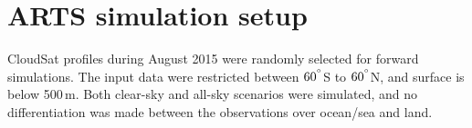 \documentclass[amt, manuscript]{copernicus}
\begin{document}











\appendix
\section{ARTS simulation setup}    %
\label{appendix:ARTS_setup}
%
CloudSat profiles during August 2015 were randomly selected for forward simulations. The input data were restricted between $60^{^{\circ}}$S to $60^{^{\circ}}$N, and surface is below 500\,m. Both clear-sky and all-sky scenarios were simulated, and no differentiation was made between the observations over ocean/sea and land. 
\end{document}
